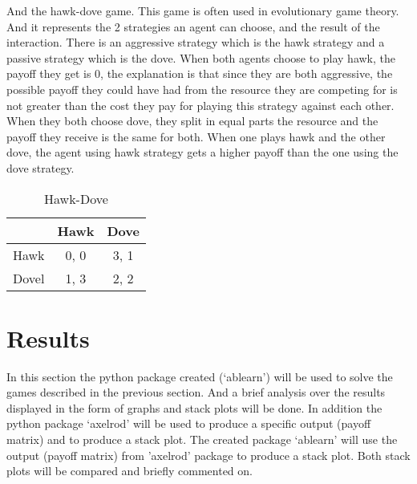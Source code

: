 And the hawk-dove game. This game is often used in  evolutionary game theory. And it represents the 2 strategies an agent can choose,  and the result of the interaction. There is an aggressive strategy which is the hawk strategy and a passive strategy which is the dove. When both agents choose to play hawk, the payoff they get is 0, the explanation is that since they are both aggressive, the possible payoff they could have had from the resource they are competing for is not greater than the cost they pay for playing this strategy against each other. When they both choose dove, they split in equal parts the resource and the payoff they receive is the same for both. When one plays hawk and the other dove, the agent using hawk strategy gets a higher payoff than the one using the dove strategy.    

\begin{table}[h]
\begin{center}
\begin{tabular}{|l|c|c|}
\hline
 & Hawk & Dove \\ 
\hline
Hawk & 0, 0 & 3, 1\\
\hline
 Dovel & 1, 3 & 2, 2\\
\hline
\end{tabular}
\end{center}
\caption{Hawk-Dove}
\label{tab:hdtag}
\end{table}

\newpage
\section{Results}
In this section the python package created (`ablearn') will be used to solve the games described in the previous section. And a brief analysis over the results displayed in the form of graphs and stack plots will be done. In addition the python package `axelrod' will be used to produce a specific output (payoff matrix) and to produce a stack plot. The created package `ablearn'  will use the output (payoff matrix) from 'axelrod' package to produce a stack plot. Both stack plots will be compared and briefly commented on.  
